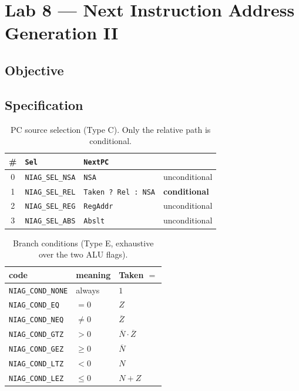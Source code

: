 
\chapter{Lab 8 --- Next Instruction Address Generation II}

\section{Objective}

\section{Specification}

\begin{table}[htbp]
\centering
\caption{PC source selection (Type C). Only the relative path is conditional.}
\label{tab:lab08-sel}
\begin{tabular}{cl||ll}
\toprule
\# & \texttt{Sel} & \texttt{NextPC} & \\
\midrule
0 & \texttt{NIAG\_SEL\_NSA} & \texttt{NSA} & unconditional \\
1 & \texttt{NIAG\_SEL\_REL} & \texttt{Taken ? Rel : NSA} & \textbf{conditional} \\
2 & \texttt{NIAG\_SEL\_REG} & \texttt{RegAddr} & unconditional \\
3 & \texttt{NIAG\_SEL\_ABS} & \texttt{Abslt} & unconditional \\
\bottomrule
\end{tabular}
\end{table}

\begin{table}[htbp]
\centering
\caption{Branch conditions (Type E, exhaustive over the two ALU flags).}
\label{tab:lab08-cond}
\begin{tabular}{lll}
\toprule
code & meaning & Taken $=$ \\
\midrule
\texttt{NIAG\_COND\_NONE} & always   & $1$ \\
\texttt{NIAG\_COND\_EQ}   & $=0$     & $Z$ \\
\texttt{NIAG\_COND\_NEQ}  & $\neq 0$ & $\overline{Z}$ \\
\texttt{NIAG\_COND\_GTZ}  & $>0$     & $\overline{N}\cdot\overline{Z}$ \\
\texttt{NIAG\_COND\_GEZ}  & $\geq 0$ & $\overline{N}$ \\
\texttt{NIAG\_COND\_LTZ}  & $<0$     & $N$ \\
\texttt{NIAG\_COND\_LEZ}  & $\leq 0$ & $N + Z$ \\
\bottomrule
\end{tabular}
\end{table}

